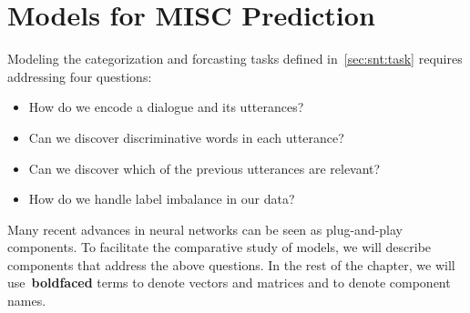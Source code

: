 \section{Models for MISC Prediction}
\label{sec:snt:devices}

Modeling the categorization and forcasting tasks defined in~\autoref{sec:snt:task} requires
addressing four questions:
\begin{itemize}
\item How do we encode a dialogue and its utterances?
\item Can we discover discriminative words in each utterance?
\item Can we discover which of the previous utterances are relevant?
\item How do we handle label imbalance in our data?
\end{itemize}
%
Many recent advances in neural networks can be seen as plug-and-play
components. To facilitate the comparative study of models, we will
describe components that address the above questions.  %
%
In the rest of the chapter, we will use~\textbf{boldfaced} terms to
denote vectors and matrices and  to denote
component names.

%












%

